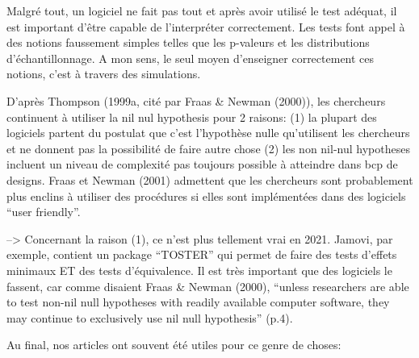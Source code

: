 \documentclass[
  12pt,
  french,
]{article}
\begin{document}
Malgré tout, un logiciel ne fait pas tout et après avoir utilisé le test
adéquat, il est important d'être capable de l'interpréter correctement.
Les tests font appel à des notions faussement simples telles que les
p-valeurs et les distributions d'échantillonnage. A mon sens, le seul
moyen d'enseigner correctement ces notions, c'est à travers des
simulations.

D'après Thompson (1999a, cité par Fraas \& Newman (2000)), les
chercheurs continuent à utiliser la nil nul hypothesis pour 2 raisons:
(1) la plupart des logiciels partent du postulat que c'est l'hypothèse
nulle qu'utilisent les chercheurs et ne donnent pas la possibilité de
faire autre chose (2) les non nil-nul hypotheses incluent un niveau de
complexité pas toujours possible à atteindre dans bcp de designs. Fraas
et Newman (2001) admettent que les chercheurs sont probablement plus
enclins à utiliser des procédures si elles sont implémentées dans des
logiciels ``user friendly''.

--\textgreater{} Concernant la raison (1), ce n'est plus tellement vrai
en 2021. Jamovi, par exemple, contient un package ``TOSTER'' qui permet
de faire des tests d'effets minimaux ET des tests d'équivalence. Il est
très important que des logiciels le fassent, car comme disaient Fraas \&
Newman (2000), ``unless researchers are able to test non-nil null
hypotheses with readily available computer software, they may continue
to exclusively use nil null hypothesis'' (p.4).

Au final, nos articles ont souvent été utiles pour ce genre de choses:
\end{document}
